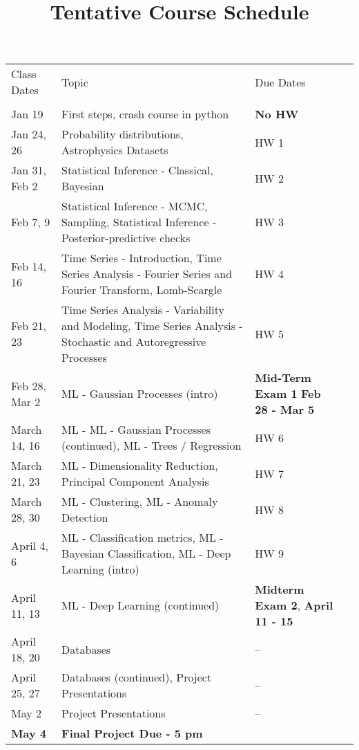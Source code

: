 \documentclass[12pt]{article}
\begin{document}
\begin{table}[h]
\small
\title{\bf \Large Tentative Course Schedule}
\centering
\begin{tabular}{|p{25mm}|p{70mm}|p{15mm}|p{35mm}|}
\hline
Class Dates & Topic & Due Dates \\
 &  & \\
\hline
Jan 19 & First steps, crash course in python & {\bf No HW} \\
\hline
Jan 24, 26 & Probability distributions, Astrophysics Datasets & HW 1 \\
 \hline
Jan 31, Feb 2 & Statistical Inference - Classical, Bayesian  & HW 2 \\
 \hline
Feb 7, 9 & Statistical Inference - MCMC, Sampling, Statistical Inference - Posterior-predictive checks  & HW 3  \\
\hline
Feb 14, 16 & Time Series - Introduction, Time Series Analysis - Fourier Series and Fourier Transform, Lomb-Scargle  & HW 4 \\
 \hline
Feb 21, 23 & Time Series Analysis - Variability and Modeling, Time Series Analysis - Stochastic and Autoregressive Processes & HW 5 \\
 \hline
Feb 28, Mar 2 & ML - Gaussian Processes (intro) & {\bf Mid-Term Exam 1} {\bf Feb 28 - Mar 5}  \\
 \hline
March 14, 16 & ML - ML - Gaussian Processes (continued),  ML - Trees / Regression & HW 6  \\
 \hline
March 21, 23 & ML - Dimensionality Reduction, Principal Component Analysis & HW 7  \\ 
 \hline
March 28, 30 &   ML - Clustering, ML - Anomaly Detection & HW 8 \\ 
 \hline
April 4, 6 & ML - Classification metrics, ML - Bayesian Classification, ML - Deep Learning (intro) & HW 9 \\
 \hline 
April 11, 13 &  ML - Deep Learning (continued) &  {\bf Midterm Exam 2}, {\bf April 11 - 15} \\
 \hline
 April 18, 20 & Databases  & -- \\
 \hline
 April 25, 27 & Databases (continued), Project Presentations  & -- \\
 \hline
 May 2 & Project Presentations & -- \\
 \hline
{\bf May 4} & {\bf Final Project Due - 5 pm} & ~\\ 
\hline
\end{tabular}
\label{tab:chisq}
\end{table}
\clearpage
\end{document}
